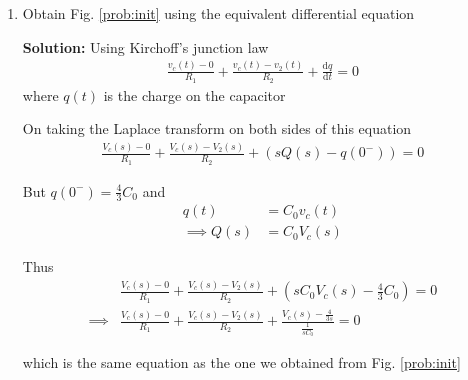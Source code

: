 \documentclass[journal,12pt,twocolumn]{IEEEtran}
\newcommand{\solution}{\noindent \textbf{Solution: }}
\providecommand{\brak}[1]{\ensuremath{\left(#1\right)}}
\providecommand{\der}[1]{\mathrm{d} #1}
\numberwithin{equation}{section}
\numberwithin{figure}{section}
\renewcommand\thesection{\arabic{section}}
\begin{document}
\begin{enumerate}[label=\thesection.\arabic*.,ref=\thesection.\theenumi]
	\item Obtain Fig. \ref{prob:init} using the equivalent differential equation
	
	\solution Using Kirchoff's junction law
	\begin{align}
		\frac{v_c(t) - 0}{R_1} + \frac{v_c(t) - v_2(t)}{R_2} + \frac{\der{q}}{\der{t}} = 0
	\end{align}
	where $q(t)$ is the charge on the capacitor
	
	On taking the Laplace transform on both sides of this equation
	\begin{align}
		\frac{V_c(s) - 0}{R_1} + \frac{V_c(s) - V_2(s)}{R_2} + \brak{sQ(s) - q(0^-)} = 0
	\end{align}
	
	But $q(0^-) = \frac43 C_0$ and 
	\begin{align}
		q(t) &= C_0v_c(t) \\
		\implies Q(s) &= C_0V_c(s)
	\end{align}
	
	Thus
	\begin{align}
		&\frac{V_c(s) - 0}{R_1} + \frac{V_c(s) - V_2(s)}{R_2} + \brak{sC_0V_c(s) - \frac43 C_0} = 0 \\
		\implies &\frac{V_c(s) - 0}{R_1} + 	\frac{V_c(s) - V_2(s)}{R_2} + \frac{V_c(s) - \frac{4}{3s}}{\frac{1}{sC_0}} = 0 
	\end{align}
	
	which is the same equation as the one we obtained from Fig. \ref{prob:init}
	\end{enumerate}
	
\end{document}
